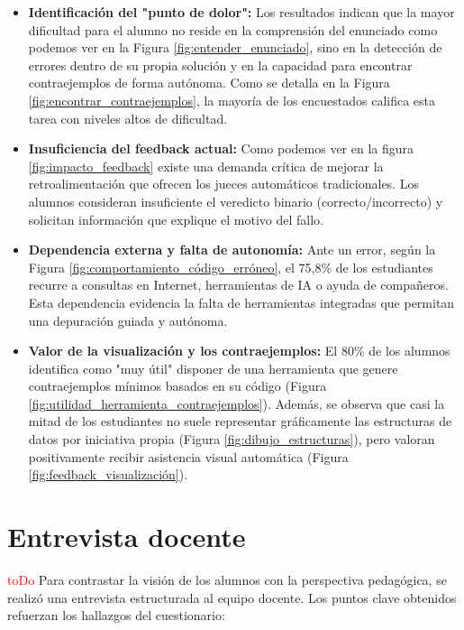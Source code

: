 \begin{itemize}
    \item \textbf{Identificación del "punto de dolor":} Los resultados indican que la mayor dificultad para el alumno no reside en la comprensión del enunciado como podemos ver en la Figura \ref{fig:entender_enunciado}, sino en la detección de errores dentro de su propia solución y en la capacidad para encontrar contraejemplos de forma autónoma. Como se detalla en la Figura \ref{fig:encontrar_contraejemplos}, la mayoría de los encuestados califica esta tarea con niveles altos de dificultad.
    
    \item \textbf{Insuficiencia del feedback actual:} Como podemos ver en la figura \ref{fig:impacto_feedback} existe una demanda crítica de mejorar la retroalimentación que ofrecen los jueces automáticos tradicionales. Los alumnos consideran insuficiente el veredicto binario (correcto/incorrecto) y solicitan información que explique el motivo del fallo. 
    
    \item \textbf{Dependencia externa y falta de autonomía:} Ante un error, según la Figura \ref{fig:comportamiento_código_erróneo}, el 75,8\% de los estudiantes recurre a consultas en Internet, herramientas de IA o ayuda de compañeros. Esta dependencia evidencia la falta de herramientas integradas que permitan una depuración guiada y autónoma.
    
    \item \textbf{Valor de la visualización y los contraejemplos:} El 80\% de los alumnos identifica como "muy útil" disponer de una herramienta que genere contraejemplos mínimos basados en su código (Figura \ref{fig:utilidad_herramienta_contraejemplos}). Además, se observa que casi la mitad de los estudiantes no suele representar gráficamente las estructuras de datos por iniciativa propia (Figura \ref{fig:dibujo_estructuras}), pero valoran positivamente recibir asistencia visual automática (Figura \ref{fig:feedback_visualización}).
\end{itemize}

\section{Entrevista docente}
\textcolor{red}{toDo}
Para contrastar la visión de los alumnos con la perspectiva pedagógica, se realizó una entrevista estructurada al equipo docente. Los puntos clave obtenidos refuerzan los hallazgos del cuestionario:

